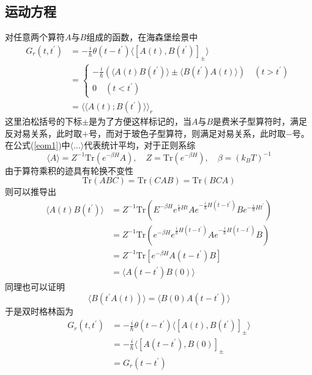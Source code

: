 \subsection{运动方程}
对任意两个算符$A$与$B$组成的函数，在海森堡绘景中
\begin{equation}
\begin{aligned}
G_r(t,t^{'})&=-\frac{i}{\hbar}\theta(t-t^{'})\langle\left[A(t),B(t^{'})\right]_\pm\rangle\\
&=\left\{
\begin{array}{cc}
-\frac{i}{\hbar}(\langle A(t)B(t^{'})\rangle\pm\langle B(t^{'})A(t)\rangle)\quad (t>t^{'})\\
0\quad(t<t^{'})
\end{array}
\right.\\
&=\langle\langle A(t);B(t^{'})\rangle\rangle_r\label{eom1}
\end{aligned}
\end{equation}
这里泊松括号的下标$\pm$是为了方便这样标记的，当$A$与$B$是费米子型算符时，满足反对易关系，此时取$+$号，而对于玻色子型算符，则满足对易关系，此时取$-$号。在公式(\ref{eom1})中$\langle\dots\rangle$代表统计平均，对于正则系综
\begin{equation}
\langle A\rangle=Z^{-1}\mathrm{Tr}(e^{-\beta H}A),\quad Z=\mathrm{Tr}(e^{-\beta H}),\quad\beta=(k_BT)^{-1}
\end{equation}
由于算符乘积的迹具有轮换不变性
\begin{equation}
\mathrm{Tr}(ABC)=\mathrm{Tr}(CAB)=\mathrm{Tr}(BCA)
\end{equation}
则可以推导出
\begin{equation}
\begin{aligned}
\langle A(t)B(t^{'})\rangle&=Z^{-1}\mathrm{Tr}(E^{-\beta H}e^{\frac{i}{\hbar}Ht}Ae^{-\frac{i}{\hbar}H(t-t^{'})}Be^{-\frac{i}{\hbar}Ht^{'}})\\
&=Z^{-1}\mathrm{Tr}(e^{-\beta H}e^{\frac{i}{\hbar}H(t-t^{'})}Ae^{-\frac{i}{\hbar}H(t-t^{'})}B)\\
&=Z^{-1}\mathrm{Tr}\left[e^{-\beta H}A(t-t^{'})B\right]\\
&=\langle A(t-t^{'})B(0)\rangle
\end{aligned}
\end{equation}
同理也可以证明
\begin{equation}
\langle B(t^{'}A(t))\rangle=\langle B(0)A(t-t^{'})\rangle
\end{equation}
于是双时格林函为
\begin{equation}
\begin{aligned}
G_r(t,t^{'})&=-\frac{i}{\hbar}\theta(t-t^{'})\langle\left[A(t),B(t^{'})\right]_\pm\rangle\\
&=-\frac{i}{\hbar}\langle\left[A(t-t^{'}),B(0)\right]_\pm\\
&=G_r(t-t^{'})
\end{aligned}
\end{equation}
